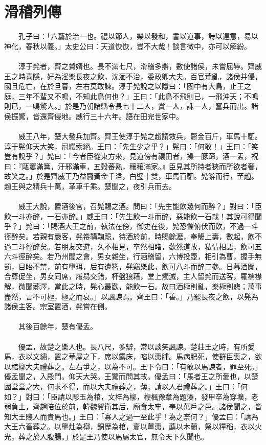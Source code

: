 \section{滑稽列傳}
　　孔子曰：「六藝於治一也。禮以節人，樂以發和，書以道事，詩以達意，易以神化，春秋以義。」太史公曰：天道恢恢，豈不大哉！談言微中，亦可以解紛。
\\\\
　　淳于髡者，齊之贅婿也。長不滿七尺，滑稽多辯，數使諸侯，未嘗屈辱。齊威王之時喜隱，好為淫樂長夜之飲，沈湎不治，委政卿大夫。百官荒亂，諸侯并侵，國且危亡，在於旦暮，左右莫敢諫。淳于髡說之以隱曰：「國中有大鳥，止王之庭，三年不蜚又不鳴，不知此鳥何也？」王曰：「此鳥不飛則已，一飛沖天；不鳴則已，一鳴驚人。」於是乃朝諸縣令長七十二人，賞一人，誅一人，奮兵而出。諸侯振驚，皆還齊侵地。威行三十六年。語在田完世家中。
\\\\
　　威王八年，楚大發兵加齊。齊王使淳于髡之趙請救兵，齎金百斤，車馬十駟。淳于髡仰天大笑，冠纓索絕。王曰：「先生少之乎？」髡曰：「何敢！」王曰：「笑豈有說乎？」髡曰：「今者臣從東方來，見道傍有禳田者，操一豚蹄，酒一盂，祝曰：『甌窶滿篝，汙邪滿車，五穀蕃熟，穰穰滿家。』臣見其所持者狹而所欲者奢，故笑之。」於是齊威王乃益齎黃金千溢，白璧十雙，車馬百駟。髡辭而行，至趙。趙王與之精兵十萬，革車千乘。楚聞之，夜引兵而去。
\\\\
　　威王大說，置酒後宮，召髡賜之酒。問曰：「先生能飲幾何而醉？」對曰：「臣飲一斗亦醉，一石亦醉。」威王曰：「先生飲一斗而醉，惡能飲一石哉！其說可得聞乎？」髡曰：「賜酒大王之前，執法在傍，御史在後，髡恐懼俯伏而飲，不過一斗徑醉矣。若親有嚴客，髡帣韝鞠跽，待酒於前，時賜餘瀝，奉觴上壽，數起，飲不過二斗徑醉矣。若朋友交遊，久不相見，卒然相睹，歡然道故，私情相語，飲可五六斗徑醉矣。若乃州閭之會，男女雜坐，行酒稽留，六博投壺，相引為曹，握手無罰，目眙不禁，前有墮珥，后有遺簪，髡竊樂此，飲可八斗而醉二參。日暮酒闌，合尊促坐，男女同席，履舄交錯，杯盤狼藉，堂上燭滅，主人留髡而送客，羅襦襟解，微聞薌澤，當此之時，髡心最歡，能飲一石。故曰酒極則亂，樂極則悲；萬事盡然，言不可極，極之而衰。」以諷諫焉。齊王曰：「善。」乃罷長夜之飲，以髡為諸侯主客。宗室置酒，髡嘗在側。
\\\\
　　其後百餘年，楚有優孟。
\\\\
　　優孟，故楚之樂人也。長八尺，多辯，常以談笑諷諫。楚莊王之時，有所愛馬，衣以文繡，置之華屋之下，席以露床，啗以棗脯。馬病肥死，使群臣喪之，欲以棺槨大夫禮葬之。左右爭之，以為不可。王下令曰：「有敢以馬諫者，罪至死。」優孟聞之，入殿門。仰天大哭。王驚而問其故。優孟曰：「馬者王之所愛也，以楚國堂堂之大，何求不得，而以大夫禮葬之，薄，請以人君禮葬之。」王曰：「何如？」對曰：「臣請以彫玉為棺，文梓為槨，楩楓豫章為題湊，發甲卒為穿壙，老弱負土，齊趙陪位於前，韓魏翼衛其后，廟食太牢，奉以萬戶之邑。諸侯聞之，皆知大王賤人而貴馬也。」王曰：「寡人之過一至此乎！為之柰何？」優孟曰：「請為大王六畜葬之。以壟灶為槨，銅歷為棺，齎以薑棗，薦以木蘭，祭以糧稻，衣以火光，葬之於人腹腸。」於是王乃使以馬屬太官，無令天下久聞也。
